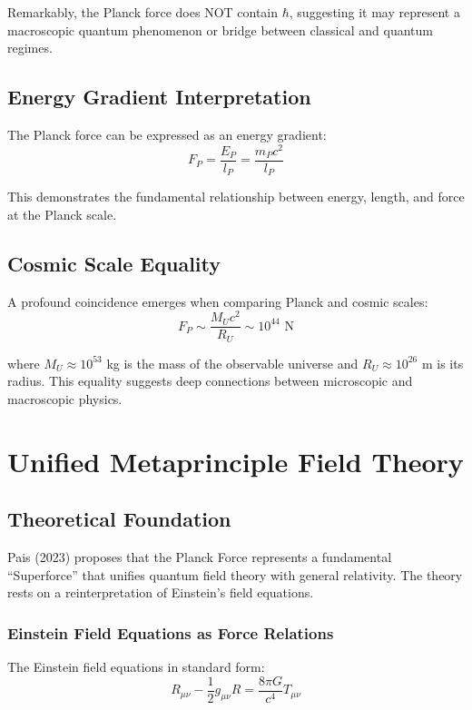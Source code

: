 Remarkably, the Planck force does NOT contain $\hbar$, suggesting it may represent a macroscopic quantum phenomenon or bridge between classical and quantum regimes.

\subsection{Energy Gradient Interpretation}

The Planck force can be expressed as an energy gradient:
\begin{equation}
F_P = \frac{E_P}{l_P} = \frac{m_P c^2}{l_P}
\end{equation}

This demonstrates the fundamental relationship between energy, length, and force at the Planck scale.

\subsection{Cosmic Scale Equality}

A profound coincidence emerges when comparing Planck and cosmic scales:
\begin{equation}
F_P \sim \frac{M_U c^2}{R_U} \sim 10^{44} \text{ N}
\end{equation}

where $M_U \approx 10^{53}$ kg is the mass of the observable universe and $R_U \approx 10^{26}$ m is its radius. This equality suggests deep connections between microscopic and macroscopic physics.

\section{Unified Metaprinciple Field Theory}

\subsection{Theoretical Foundation}

Pais (2023) proposes that the Planck Force represents a fundamental ``Superforce'' that unifies quantum field theory with general relativity. The theory rests on a reinterpretation of Einstein's field equations.

\subsubsection{Einstein Field Equations as Force Relations}

The Einstein field equations in standard form:
\begin{equation}
R_{\mu\nu} - \frac{1}{2}g_{\mu\nu}R = \frac{8\pi G}{c^4} T_{\mu\nu}
\end{equation}

